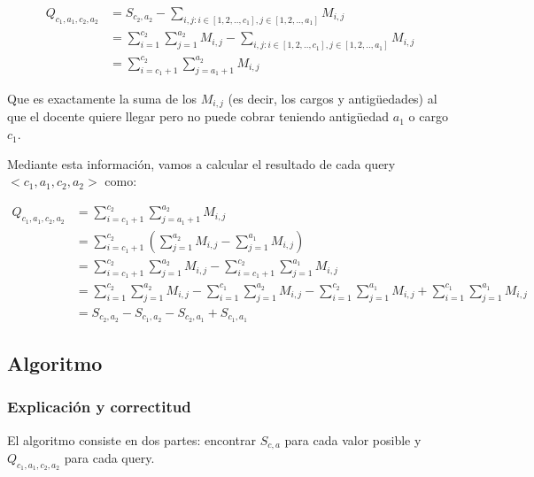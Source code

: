 \begin{equation*}
\begin{split}
    Q_{c_1,a_1,c_2,a_2} & = S_{c_2,a_2} - \sum_{i,j : i \in [1,2,..,c_1], j \in [1,2,..,a_1]}^{}{M_{i,j}} \\
    					& = \sum_{i=1}^{c_2}{\sum_{j=1}^{a_2}{M_{i,j}}} - 
    						\sum_{i,j : i \in [1,2,..,c_1], j \in [1,2,..,a_1]}^{}{M_{i,j}} \\
    					& = \sum_{i=c_1+1}^{c_2}{\sum_{j=a_1+1}^{a_2}{M_{i,j}}}
\end{split}
\end{equation*}

Que es exactamente la suma de los $M_{i,j}$ (es decir, los cargos y antigüedades) al que el docente
quiere llegar pero no puede cobrar teniendo antigüedad $a_1$ o cargo $c_1$.

Mediante esta información, vamos a calcular el resultado de cada query $<c_1, a_1, c_2, a_2>$ como:

\begin{equation*}
\begin{split}
    Q_{c_1,a_1,c_2,a_2} & = \sum_{i=c_1+1}^{c_2}{\sum_{j=a_1+1}^{a_2}{M_{i,j}}} \\
    					& = \sum_{i=c_1+1}^{c_2}{(\sum_{j=1}^{a_2}{M_{i,j}} - \sum_{j=1}^{a_1}{M_{i,j}})} \\
    					& = \sum_{i=c_1+1}^{c_2}{\sum_{j=1}^{a_2}{M_{i,j}}} - \sum_{i=c_1+1}^{c_2}{\sum_{j=1}^{a_1}{M_{i,j}}} \\
    					& = \sum_{i=1}^{c_2}{\sum_{j=1}^{a_2}{M_{i,j}}} - \sum_{i=1}^{c_1}{\sum_{j=1}^{a_2}{M_{i,j}}} -
    					\sum_{i=1}^{c_2}{\sum_{j=1}^{a_1}{M_{i,j}}} + \sum_{i=1}^{c_1}{\sum_{j=1}^{a_1}{M_{i,j}}} \\
    					& = S_{c_2,a_2} - S_{c_1,a_2} - S_{c_2,a_1} + S_{c_1,a_1}
\end{split}
\end{equation*}

\subsection{Algoritmo}

\subsubsection*{Explicación y correctitud}

El algoritmo consiste en dos partes: encontrar $S_{c,a}$ para cada valor posible y $Q_{c_1,a_1,c_2,a_2}$
para cada query.

